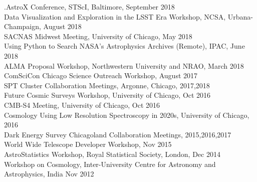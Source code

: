 \documentclass[margin]{res}
\begin{document}
\begin{resume}
.AstroX Conference, STScI, Baltimore, September 2018\\
Data Visualization and Exploration in the LSST Era Workshop, NCSA, Urbana-Champaign, August 2018\\
SACNAS Midwest Meeting, University of Chicago, May 2018\\
Using Python to Search NASA's Astrophysics Archives (Remote), IPAC, June 2018\\
ALMA Proposal Workshop, Northwestern University and NRAO, March 2018\\
ComSciCon Chicago Science Outreach Workshop, August 2017\\
SPT Cluster Collaboration Meetings, Argonne, Chicago, 2017,2018\\
Future Cosmic Surveys Workshop, University of Chicago, Oct 2016\\
CMB-S4 Meeting, University of Chicago, Oct 2016\\
Cosmology Using Low Resolution Spectroscopy in 2020s, University of Chicago, 2016\\
Dark Energy Survey Chicagoland Collaboration Meetings, 2015,2016,2017\\
World Wide Telescope Developer Workshop, Nov 2015\\
AstroStatistics Workshop, Royal Statistical Society, London, Dec 2014\\
Workshop on Cosmology, Inter-University Centre for Astronomy and Astrophysics, India Nov 2012


\end{resume}
\end{document}
